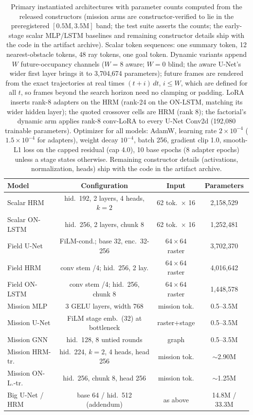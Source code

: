 \documentclass[letterpaper]{article} %
\begin{document}
\begin{table}[t]
\centering
\small
\setlength{\tabcolsep}{1.6pt}
\begin{tabular}{@{}lccc@{}}
\toprule
Model & Configuration & Input & Parameters \\
\midrule
Scalar HRM & hid.\ 192, 2 layers, 4 heads, $k{=}2$ & 62 tok.\ $\times$ 16 & 2{,}158{,}529 \\
Scalar ON-LSTM & hid.\ 256, 2 layers, chunk 8 & 62 tok.\ $\times$ 16 & 1{,}252{,}481 \\
Field U-Net & FiLM-cond.; base 32, enc.\ 32-256 & $64{\times}64$ raster & 3{,}702{,}370 \\
Field HRM & conv stem /4; hid.\ 256, 2 lay. & $64{\times}64$ raster & 4{,}016{,}642 \\
Field ON-LSTM & conv stem /4; hid.\ 256, chunk 8 & $64{\times}64$ raster & 1{,}448{,}578 \\
\midrule
Mission MLP & 3 GELU layers, width 768 & mission tok. & 0.5--3.5M \\
Mission U-Net & FiLM stage emb.\ (32) at bottleneck & raster+stage & 0.5--3.5M \\
Mission GNN & hid.\ 128, 8 untied rounds & graph & 0.5--3.5M \\
Mission HRM-tr. & hid.\ 224, $k{=}2$, 4 heads, head 256 & mission tok. & $\sim$2.90M \\
Mission ON-L.-tr. & hid.\ 256, chunk 8, head 256 & mission tok. & $\sim$1.25M \\
Big U-Net / HRM & base 64 / hid.\ 512 (addendum) & as above & 14.8M / 33.3M \\
\bottomrule
\end{tabular}
\caption{Primary instantiated architectures with parameter counts computed from the released constructors (mission arms are constructor-verified to lie in the preregistered $[0.5\mathrm{M}, 3.5\mathrm{M}]$ band; the test suite asserts the counts; the early-stage scalar MLP/LSTM baselines and remaining constructor details ship with the code in the artifact archive). Scalar token sequences: one summary token, 12 nearest-obstacle tokens, 48 ray tokens, one goal token. Dynamic variants append $W$ future-occupancy channels ($W{=}8$ aware; $W{=}0$ blind; the aware U-Net's wider first layer brings it to 3{,}704{,}674 parameters); future frames are rendered from the exact trajectories at real times $(t{+}i)\,dt$, $i \le W$, which are defined for all $t$, so frames beyond the search horizon need no clamping or padding. LoRA \citep{hu2021lora} inserts rank-8 adapters on the HRM (rank-24 on the ON-LSTM, matching its wider hidden layer); the quoted crossover cells are HRM (rank 8); the factorial's dynamic arm applies rank-8 conv-LoRA to every U-Net Conv2d (192{,}080 trainable parameters). Optimizer for all models: AdamW, learning rate $2{\times}10^{-4}$ ($1.5{\times}10^{-4}$ for adapters), weight decay $10^{-4}$, batch 256, gradient clip 1.0, smooth-L1 loss on the capped residual (cap 4.0), 10 base epochs (8 adapter epochs) unless a stage states otherwise. Remaining constructor details (activations, normalization, heads) ship with the code in the artifact archive.}
\label{tab:archspec}
\end{table}
\end{document}
